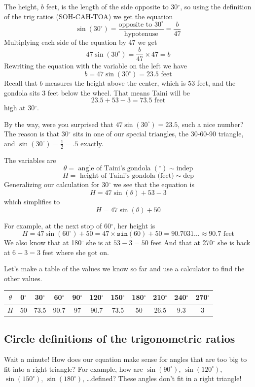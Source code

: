 The height, $b$ feet, is the length of the side opposite to 30$^\circ$, so using the definition of the trig ratios (SOH-CAH-TOA) we get the equation
$$\sin(30^\circ) = \frac{\text{opposite to 30}^\circ}{\text{hypotenuse}} = \frac{b}{47}$$
Multiplying each side of the equation by 47 we get 
$$47\sin(30^\circ) = \frac{b}{47} \times 47 = b$$
Rewriting the equation with the variable on the left we have
$$b = 47\sin(30^\circ) = 23.5 \text{ feet}$$
Recall that $b$ measures the height above the center, which is 53 feet, and the gondola sits 3 feet below the wheel. That means Taini will be
$$23.5 + 53 - 3 = 73.5 \text{ feet}$$
high at 30$^\circ$.  

By the way, were you surprised that $47\sin(30^\circ) = 23.5$, such a nice number?  The reason is that 30$^\circ$ sits in one of our special triangles, the 30-60-90 triangle, and $\sin(30^\circ) = \frac{1}{2} = .5$ exactly. 

The variables are $$\theta = \text{ angle of Taini's gondola }(^\circ) \sim \text{indep}$$
$$H = \text{ height of Taini's gondola (feet)} \sim \text{dep}$$
Generalizing our calculation for 30$^\circ$ we see that the equation is $$H = 47 \sin(\theta) + 53 - 3$$ which simplifies to $$H = 47 \sin(\theta) + 50$$

For example, at the next stop of 60$^\circ$, her height is $$H = 47 \sin(60^\circ) + 50 =47 \times \boxed{\texttt{sin}}(60)+50= 90.7031\ldots
\approx 90.7 \text{ feet}$$
We also know that at 180$^\circ$ she is at $53-3 = 50$ feet And that at 270$^\circ$ she is back at $6-3=3$ feet where she got on.

Let's make a table of the values we know so far and use a calculator to find the other values.

\begin{center}
\begin{tabular}{c|c|c|c |c|c|c |c|c|c |c}
    $\theta$ & 0$^\circ$ & 30$^\circ$ & 60$^\circ$ & 90$^\circ$ & 120$^\circ$ & 150$^\circ$ & 180$^\circ$ & 210$^\circ$ & 240$^\circ$ & 270$^\circ$\\ \hline
    $H$ & 50 & 73.5 & 90.7 & 97 & 90.7 & 73.5 & 50 & 26.5 & 9.3 & 3 
\end{tabular}
\end{center}

\subsection*{Circle definitions of the trigonometric ratios}

Wait a minute!  How does our equation make sense for angles that are too big to fit into a right triangle?  For example, how are $\sin(90^\circ)$, $\sin(120^\circ)$, $ \sin(150^\circ)$, $\sin(180^\circ)$, \ldots  defined?  These angles don't fit in a right triangle!

